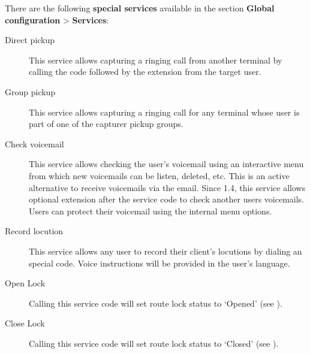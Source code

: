 \documentclass[letterpaper,10pt,english]{sphinxmanual}
\begin{document}
There are the following \textbf{special services} available in the section \textbf{Global
configuration} \textgreater{} \textbf{Services}:
\begin{description}
\item[{Direct pickup}] \leavevmode{}\label{administration_portal/platform/services:term-direct-pickup}
This service allows capturing a ringing call from another terminal by
calling the code followed by the extension from the target user.

\item[{Group pickup}] \leavevmode{}\label{administration_portal/platform/services:term-group-pickup}
This service allows capturing a ringing call for any terminal whose user
is part of one of the capturer pickup groups.

\item[{Check voicemail}] \leavevmode{}\label{administration_portal/platform/services:term-check-voicemail}
This service allows checking the user's voicemail using an interactive
menu from which new voicemails can be listen, deleted, etc. This is an
active alternative to receive voicemails via the email. Since 1.4, this
service allows optional extension after the service code to check
another users voicemails. Users can protect their voicemail using the
internal menu options.

\item[{Record locution}] \leavevmode{}\label{administration_portal/platform/services:term-record-locution}
This service allows any user to record their client's locutions by
dialing an special code. Voice instructions will be provided in the
user's language.

\item[{Open Lock}] \leavevmode{}\label{administration_portal/platform/services:term-open-lock}
Calling this service code will set route lock status to `Opened' (see {\hyperref[administration_portal/client/vpbx/routing_tools/route_locks:route\string-locks]{}}).

\item[{Close Lock}] \leavevmode{}\label{administration_portal/platform/services:term-close-lock}
Calling this service code will set route lock status to `Closed' (see {\hyperref[administration_portal/client/vpbx/routing_tools/route_locks:route\string-locks]{}}).


\end{description}
\end{document}
